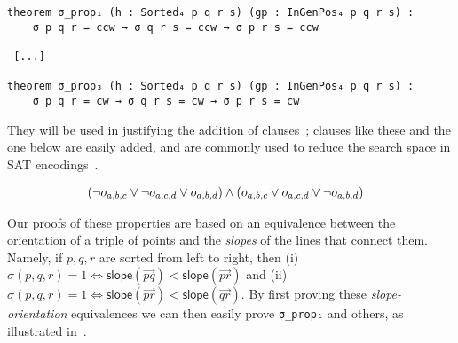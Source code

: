 \begin{lstlisting}
theorem σ_prop₁ (h : Sorted₄ p q r s) (gp : InGenPos₄ p q r s) :
    σ p q r = ccw → σ q r s = ccw → σ p r s = ccw

 [...]

theorem σ_prop₃ (h : Sorted₄ p q r s) (gp : InGenPos₄ p q r s) :
    σ p q r = cw → σ q r s = cw → σ p r s = cw
\end{lstlisting}

They will be used in justifying the addition of clauses~;
clauses like these and the one below are easily added,
and are commonly used to reduce the search space in SAT encodings~\cite{emptyHexagonNumber,scheucherTwoDisjoint5holes2020,subercaseaux2023minimizing, szekeres_peters_2006}.

\begin{align}
  &\left(\neg \orvar_{a, b, c} \lor \neg \orvar_{a, c, d} \lor \orvar_{a, b, d}\right) \land \left(\orvar_{a, b, c} \lor \orvar_{a, c, d} \lor  \neg \orvar_{a, b, d}\right)
\end{align}

Our proofs of these properties are based on an equivalence between the orientation of a triple of points and the \emph{slopes} of the lines that connect them. Namely, if $p, q, r$  are sorted from left to right, then (i) $\sigma(p,q,r)=1 \iff \textsf{slope}(\overrightarrow{pq}) < \textsf{slope}(\overrightarrow{pr})$  and (ii) $\sigma(p,q,r)=1 \iff \textsf{slope}(\overrightarrow{pr}) < \textsf{slope}(\overrightarrow{qr})$. By first proving these \emph{slope-orientation} equivalences we can then easily prove \lstinline|σ_prop₁| and others, as illustrated in~.


